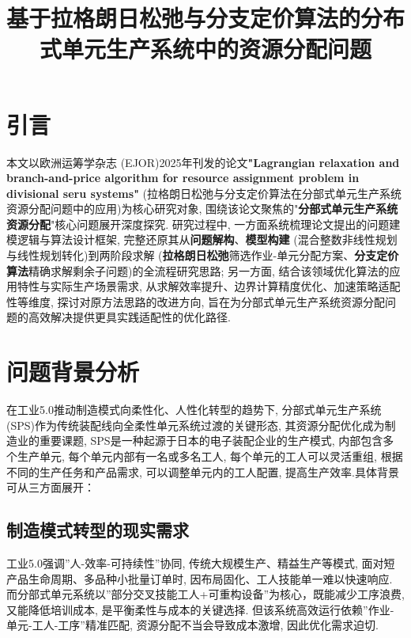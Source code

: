 \documentclass[withoutpreface,bwprint]{cumcmthesis} %
\title{基于拉格朗日松弛与分支定价算法的分布式单元生产系统中的资源分配问题}
\begin{document}
 \maketitle
 \begin{abstract}


\end{abstract}


\section{引言}
本文以欧洲运筹学杂志 (EJOR)2025年刊发的论文\textbf{"Lagrangian relaxation and branch-and-price algorithm for resource assignment problem in divisional seru systems"} (拉格朗日松弛与分支定价算法在分部式单元生产系统资源分配问题中的应用)为核心研究对象, 围绕该论文聚焦的"\textbf{分部式单元生产系统资源分配}"核心问题展开深度探究. 研究过程中, 一方面系统梳理论文提出的问题建模逻辑与算法设计框架, 完整还原其从\textbf{问题解构}、\textbf{模型构建} (混合整数非线性规划与线性规划转化)到两阶段求解 (\textbf{拉格朗日松弛}筛选作业-单元分配方案、\textbf{分支定价算法}精确求解剩余子问题)的全流程研究思路; 另一方面, 结合该领域优化算法的应用特性与实际生产场景需求, 从求解效率提升、边界计算精度优化、加速策略适配性等维度, 探讨对原方法思路的改进方向, 旨在为分部式单元生产系统资源分配问题的高效解决提供更具实践适配性的优化路径. 
\section{问题背景分析}

在工业5.0推动制造模式向柔性化、人性化转型的趋势下, 分部式单元生产系统(SPS)作为传统装配线向全柔性单元系统过渡的关键形态, 其资源分配优化成为制造业的重要课题, SPS是一种起源于日本的电子装配企业的生产模式, 内部包含多个生产单元, 每个单元内部有一名或多名工人, 每个单元的工人可以灵活重组, 根据不同的生产任务和产品需求, 可以调整单元内的工人配置, 提高生产效率.具体背景可从三方面展开：

\subsection{制造模式转型的现实需求}

工业5.0强调''人-效率-可持续性''协同\cite{Destouet2023}, 传统大规模生产、精益生产等模式, 面对短产品生命周期、多品种小批量订单时, 因布局固化、工人技能单一难以快速响应\cite{Zhang2022a, Zhang2024b}. 而分部式单元系统以''部分交叉技能工人+可重构设备''为核心，既能减少工序浪费, 又能降低培训成本, 是平衡柔性与成本的关键选择\cite{Yin2018}. 但该系统高效运行依赖''作业-单元-工人-工序''精准匹配, 资源分配不当会导致成本激增, 因此优化需求迫切\cite{Chen2025}. 
\end{document}
